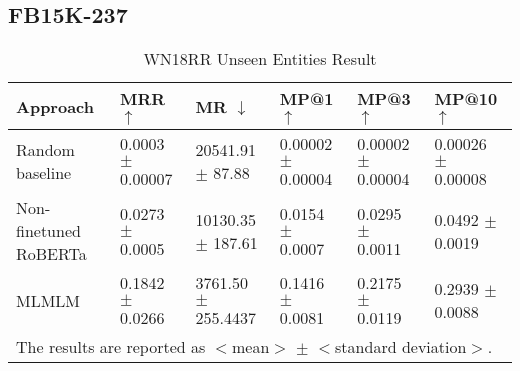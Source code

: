 \documentclass[11pt,a4paper]{article}
\newcommand{\TableW}[3]{\begin{table*}[h!]
\begin{center}
  \caption{#3} 
  \vspace{-0.25\baselineskip}
  \label{#2}
  #1
\end{center}
\end{table*}}
\begin{document}
\subsection{FB15K-237}
\TableW{\begin{tabular}{m{}m{}m{0.1\textwidth}m{0.1\textwidth}m{0.1\textwidth}m{0.1\textwidth}}
    \toprule
    Approach & MRR $\uparrow$ & MR $\downarrow$ & MP@1 $\uparrow$ & MP@3 $\uparrow$ & MP@10 $\uparrow$\\
    \midrule 
Random baseline & 
        \shortstack[l]{{0.0003}\\{\small$\pm$ 0.00007}} &
        \shortstack[l]{{20541.91}\\{\small$\pm$ 87.88}} &
        \shortstack[l]{{0.00002}\\{\small$\pm$ 0.00004}} &
        \shortstack[l]{{0.00002}\\{\small$\pm$ 0.00004}} &
        \shortstack[l]{{0.00026}\\{\small$\pm$ 0.00008}}\\
    Non-finetuned RoBERTa & 
        \shortstack[l]{{0.0273}\\{\small$\pm$ 0.0005}} &
        \shortstack[l]{{10130.35}\\{\small$\pm$ 187.61}} &
        \shortstack[l]{{0.0154}\\{\small$\pm$ 0.0007}} &
        \shortstack[l]{{0.0295}\\{\small$\pm$ 0.0011}} &
        \shortstack[l]{{0.0492}\\{\small$\pm$ 0.0019}}\\
    MLMLM & 
        \shortstack[l]{{0.1842}\\{\small$\pm$ 0.0266}} &
        \shortstack[l]{{3761.50}\\{\small$\pm$ 255.4437}} &
        \shortstack[l]{{0.1416}\\{\small$\pm$ 0.0081}} &
        \shortstack[l]{{0.2175}\\{\small$\pm$ 0.0119}} &
        \shortstack[l]{{0.2939}\\{\small$\pm$ 0.0088}}\\
    \bottomrule
    \multicolumn{6}{p{.8\textwidth}}{\small The results are reported as $<$mean$>$ $\pm$ $<$standard deviation$>$.}

  \end{tabular}}
{tab:results3}
{WN18RR Unseen Entities Result}
\end{document}
